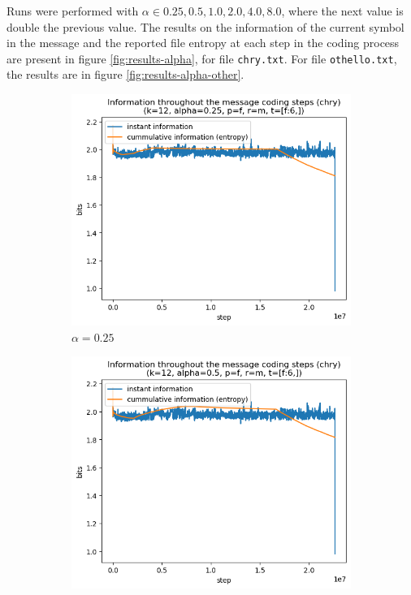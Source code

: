 \documentclass{article}
\begin{document}
Runs were performed with $\alpha \in {0.25, 0.5, 1.0, 2.0, 4.0, 8.0}$, where the next value is double the previous value.
The results on the information of the current symbol in the message and the reported file entropy at each step in the coding process are
present in figure \ref{fig:results-alpha}, for file \verb|chry.txt|.
For file \verb|othello.txt|, the results are in figure \ref{fig:results-alpha-other}.

\begin{figure}
    \begin{subfigure}[b]{0.3\textwidth}
        \begin{center}
            \includegraphics[width=1.0\linewidth]{../scripts/images/chry_12_0.25_f_m_[f:6,].png}
        \end{center}
        \caption{$\alpha = 0.25$}
        \label{fig:results-alpha-0.25}
    \end{subfigure}
    \hfill
    \begin{subfigure}[b]{0.3\textwidth}
        \begin{center}
            \includegraphics[width=1.0\linewidth]{../scripts/images/chry_12_0.5_f_m_[f:6,].png}

\end{center}
\end{subfigure}
\end{figure}
\end{document}
